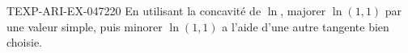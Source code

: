 \begin{exercice}{TEXP-ARI-EX-047}{2}{20}
En utilisant la concavité de $\ln$, majorer $\ln(1{,}1)$ par une valeur simple, puis minorer $\ln(1{,}1)$ a l'aide d'une autre tangente bien choisie.

\end{exercice}
